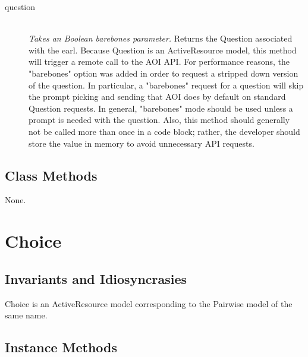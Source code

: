 \documentclass[11pt]{book}
\begin{document}
\begin{description}
  
  \item[question]  \hfill \\
  \emph{Takes an Boolean barebones parameter.} Returns the Question associated with the earl.  Because Question is an ActiveResource model, this method will trigger a remote call to the AOI API.  For performance reasons, the "barebones" option was added in order to request a stripped down version of the question.  In particular, a "barebones" request for a question will skip the prompt picking and sending that AOI does by default on standard Question requests.  In general, "barebones" mode should be used unless a prompt is needed with the question.  Also, this method should generally not be called more than once in a code block; rather, the developer should store the value in memory to avoid unnecessary API requests.

\end{description}


\subsection{Class Methods}

None.

\section{Choice}

\subsection{Invariants and Idiosyncrasies}

Choice is an ActiveResource model corresponding to the Pairwise model of the same name.

\subsection{Instance Methods}
\end{document}
